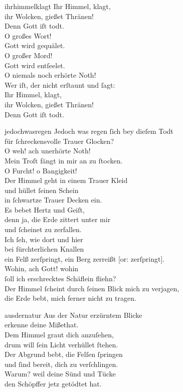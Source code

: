 \documentclass[tocstyle=ref-genre]{ees}
\begin{document}
{\begin{movement}{ihrhimmelklagt}
  \voice[Coro]
  Ihr Himmel, klagt,\\
  ihr Wolcken, gießet Thränen!\\
  Denn Gott iſt todt.\\
  O großes Wort!\\
  Gott wird gequälet.\\
  O großer Mord!\\
  Gott wird entſeelet.\\
  O niemals noch erhörte Noth!\\
  Wer iſt, der nicht erſtaunt und ſagt:\\
  Ihr Himmel, klagt,\\
  ihr Wolcken, gießet Thränen!\\
  Denn Gott iſt todt.
\end{movement}

\begin{movement}{jedochwasregen}
  Jedoch was regen ſich bey dieſem Todt\\
  für ſchreckensvolle Trauer Glocken?\\
  O weh! ach unerhörte Noth!\\
  Mein Troſt fängt in mir an zu ſtocken.\\
  O Furcht! o Bangigkeit!\\
  Der Himmel geht in einem Trauer Kleid\\
  und hüllet ſeinen Schein\\
  in ſchwartze Trauer Decken ein.\\
  Es bebet Hertz und Geiſt,\\
  denn ja, die Erde zittert unter mir\\
  und ſcheinet zu zerfallen.\\
  Ich ſeh, wie dort und hier\\
  bei fürchterlichen Knallen\\
  ein Felß zerſpringt, ein Berg zerreißt [or: zerſpringt].\\
  Wohin, ach Gott! wohin\\
  ſoll ich erschrecktes Schäflein fliehn?\\
  Der Himmel ſcheint durch ſeinen Blick mich zu verjagen,\\
  die Erde bebt, mich ferner nicht zu tragen.
\end{movement}

\begin{movement}{ausdernatur}
  Aus der Natur erzürntem Blicke\\
  erkenne deine Mißethat.\\
  Dem Himmel graut dich anzuſehen,\\
  drum will ſein Licht verhüllet ſtehen.\\
  Der Abgrund bebt, die Felſen ſpringen\\
  und ſind bereit, dich zu verſchlingen.\\
  Warum? weil deine Sünd und Tücke\\
  den Schöpffer jetz getödtet hat.
\end{movement}

}
\end{document}
